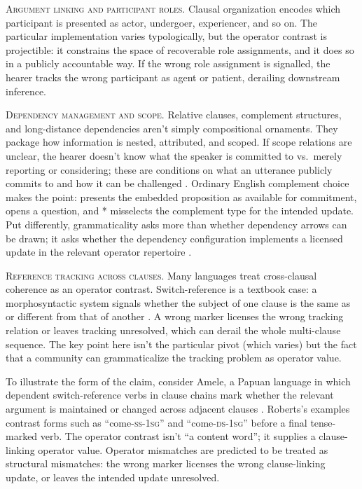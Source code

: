 \documentclass[12pt,letterpaper]{article}
\begin{document}
\textsc{Argument linking and participant roles.} Clausal organization encodes which participant is presented as actor, undergoer, experiencer, and so on. The particular implementation varies typologically, but the operator contrast is projectible: it constrains the space of recoverable role assignments, and it does so in a publicly accountable way. If the wrong role assignment is signalled, the hearer tracks the wrong participant as agent or patient, derailing downstream inference.

\textsc{Dependency management and scope.} Relative clauses, complement structures, and long-distance dependencies aren't simply compositional ornaments. They package how information is nested, attributed, and scoped. If scope relations are unclear, the hearer doesn't know what the speaker is committed to vs.\ merely reporting or considering; these are conditions on what an utterance publicly commits to and how it can be challenged \citep{stalnaker2002,farkasbruce2010}. Ordinary English complement choice makes the point:  presents the embedded proposition as available for commitment,  opens a question, and * misselects the complement type for the intended update. Put differently, grammaticality asks more than whether dependency arrows can be drawn; it asks whether the dependency configuration implements a licensed update in the relevant operator repertoire \citep{gibson2026}.

\textsc{Reference tracking across clauses.} Many languages treat cross-clausal coherence as an operator contrast. Switch-reference is a textbook case: a morphosyntactic system signals whether the subject of one clause is the same as or different from that of another \citep{vangijn2016}. A wrong marker licenses the wrong tracking relation or leaves tracking unresolved, which can derail the whole multi-clause sequence. The key point here isn't the particular pivot (which varies) but the fact that a community can grammaticalize the tracking problem as operator value.

To illustrate the form of the claim, consider Amele, a Papuan language in which dependent switch-reference verbs in clause chains mark whether the relevant argument is maintained or changed across adjacent clauses \citep{roberts1987,roberts1988,roberts2023amele}. Roberts's examples contrast forms such as  \enquote{come-\textsc{ss}-1\textsc{sg}} and  \enquote{come-\textsc{ds}-1\textsc{sg}} before a final tense-marked verb. The operator contrast isn't \enquote{a content word}; it supplies a clause-linking operator value. Operator mismatches are predicted to be treated as structural mismatches: the wrong marker licenses the wrong clause-linking update, or leaves the intended update unresolved.
\end{document}
